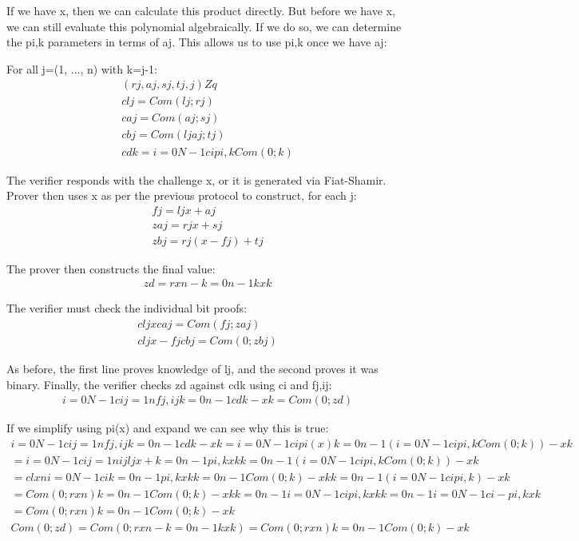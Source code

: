 \documentclass{article}
\begin{document}
If we have x, then we can calculate this product directly.  But before we have x, we can still evaluate this polynomial algebraically.  If we do so, we can determine the pi,k parameters in terms of aj.  This allows us to use pi,k once we have aj:

For all j=(1, ..., n) with k=j-1:
\begin{eqnarray}
  (rj,aj,sj,tj,j) Zq\\
  clj=Com(lj;rj)\\
  caj=Com(aj;sj)\\
  cbj=Com(ljaj;tj)\\
  cdk=i=0N-1cipi,k Com(0;k)
\end{eqnarray}

The verifier responds with the challenge x, or it is generated via Fiat-Shamir.  Prover then uses x as per the previous protocol to construct, for each j:
\begin{eqnarray}
  fj=ljx+aj\\
  zaj=rjx+sj\\
  zbj=rj(x-fj)+tj
\end{eqnarray}

The prover then constructs the final value:
\begin{eqnarray}
  zd=rxn-k=0n-1kxk
\end{eqnarray}

The verifier must check the individual bit proofs:
\begin{eqnarray}
  cljx caj=Com(fj;zaj)\\
  cljx-fjcbj=Com(0;zbj)
\end{eqnarray}
    
As before, the first line proves knowledge of lj, and the second proves it was binary.  Finally, the verifier checks zd against cdk using ci and fj,ij:
\begin{eqnarray}
  i=0N-1cij=1nfj,ij  k=0n-1cdk-xk=Com(0;zd)
\end{eqnarray}

If we simplify using pi(x) and expand we can see why this is true:
\begin{eqnarray}
  i=0N-1cij=1nfj,ij  k=0n-1cdk-xk=i=0N-1cipi(x)  k=0n-1 (i=0N-1cipi,k Com(0;k))-xk\\
  =i=0N-1cij=1nijljx+ k=0n-1pi,k xk  k=0n-1 (i=0N-1cipi,k Com(0;k))-xk\\
  =clxn i=0N-1cik=0n-1pi,k xk  k=0n-1Com(0;k)-xk k=0n-1(i=0N-1cipi,k)-xk\\
  =Com(0;rxn) k=0n-1Com(0;k)-xk  k=0n-1i=0N-1cipi,k xk  k=0n-1i=0N-1ci-pi,kxk\\
  =Com(0;rxn) k=0n-1Com(0;k)-xk\\
  Com(0;zd)=Com(0;rxn-k=0n-1kxk)=Com(0;rxn) k=0n-1Com(0;k)-xk
\end{eqnarray}
\end{document}
